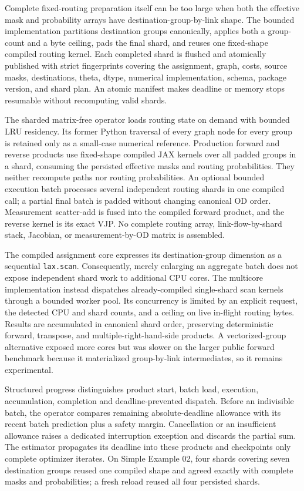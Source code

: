 Complete fixed-routing preparation itself can be too large when both the
effective mask and probability arrays have destination-group-by-link shape.
The bounded implementation partitions destination groups canonically, applies
both a group-count and a byte ceiling, pads the final shard, and reuses one
fixed-shape compiled routing kernel.  Each completed shard is flushed and
atomically published with strict fingerprints covering the assignment, graph,
costs, source masks, destinations, theta, dtype, numerical implementation,
schema, package version, and shard plan.  An atomic manifest makes deadline or
memory stops resumable without recomputing valid shards.

The sharded matrix-free operator loads routing state on demand with bounded LRU
residency.  Its former Python traversal of every graph node for every group is
retained only as a small-case numerical reference.  Production forward and
reverse products use fixed-shape compiled JAX kernels over all padded groups in
a shard, consuming the persisted effective masks and routing probabilities.
They neither recompute paths nor routing probabilities.  An optional bounded
execution batch processes several independent routing shards in one compiled
call; a partial final batch is padded without changing canonical OD order.
Measurement scatter-add is fused into the compiled forward product, and the
reverse kernel is its exact VJP.  No complete routing array, link-flow-by-shard
stack, Jacobian, or measurement-by-OD matrix is assembled.

The compiled assignment core expresses its destination-group dimension as a
sequential \texttt{lax.scan}.  Consequently, merely enlarging an aggregate
batch does not expose independent shard work to additional CPU cores.  The
multicore implementation instead dispatches already-compiled single-shard scan
kernels through a bounded worker pool.  Its concurrency is limited by an
explicit request, the detected CPU and shard counts, and a ceiling on live
in-flight routing bytes.  Results are accumulated in canonical shard order,
preserving deterministic forward, transpose, and multiple-right-hand-side
products.  A vectorized-group alternative exposed more cores but was slower on
the larger public forward benchmark because it materialized group-by-link
intermediates, so it remains experimental.

Structured progress distinguishes product start, batch load, execution,
accumulation, completion and deadline-prevented dispatch.  Before an
indivisible batch, the operator compares remaining absolute-deadline allowance
with its recent batch prediction plus a safety margin.  Cancellation or an
insufficient allowance raises a dedicated interruption exception and discards
the partial sum.  The estimator propagates its deadline into these products and
checkpoints only complete optimizer iterates.  On
Simple Example 02, four shards covering seven destination groups reused one
compiled shape and agreed exactly with complete masks and probabilities; a
fresh reload reused all four persisted shards.

